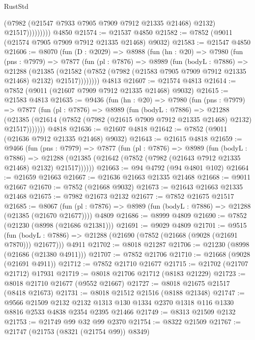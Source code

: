 \begin{lexlean}{RustStd}
\begin{coremodule}
                      (@7982 (@21547 @7933 @7905 @7909 @7912 @21335 @21468) @2132)
                      @21517)))))))))
    @4850
@21574 := @21537 @4850
@21582 := @7852 (@9011 (@21574 @7905 @7909 @7912 @21335 @21468) @9032)
@21583 := @21547 @4850
@21606 := @8070
    (fun (D : @2029) =>
    @8988
      (fun (hn : @20) =>
      @7980
        (fun (pns : @7979) =>
        @7877
          (fun (pl : @7876) =>
          @8989
            (fun (bodyL : @7886) =>
            @21288
              (@21385
                (@21582 (@7852 (@7982 (@21583 @7905 @7909 @7912 @21335 @21468) @2132) @21517))))))))
    @4813
@21607 := @21574 @4813
@21614 := @7852 (@9011 (@21607 @7909 @7912 @21335 @21468) @9032)
@21615 := @21583 @4813
@21635 := @9436
    (fun (hn : @20) =>
    @7980
      (fun (pns : @7979) =>
      @7877
        (fun (pl : @7876) =>
        @8989
          (fun (bodyL : @7886) =>
          @21288
            (@21385 (@21614 (@7852 (@7982 (@21615 @7909 @7912 @21335 @21468) @2132) @21517)))))))
    @4818
@21636 := @21607 @4818
@21642 := @7852 (@9011 (@21636 @7912 @21335 @21468) @9032)
@21643 := @21615 @4818
@21659 := @9466
    (fun (pns : @7979) =>
    @7877
      (fun (pl : @7876) =>
      @8989
        (fun (bodyL : @7886) =>
        @21288 (@21385 (@21642 (@7852 (@7982 (@21643 @7912 @21335 @21468) @2132) @21517))))))
@21663 := @94 @4792 (@94 @4801 @102)
@21664 := @21659 @21663
@21667 := @21636 @21663 @21335 @21468
@21668 := @9011 @21667
@21670 := @7852 (@21668 @9032)
@21673 := @21643 @21663 @21335 @21468
@21675 := @7982 @21673 @2132
@21677 := @7852 @21675 @21517
@21685 := @8067
    (fun (pl : @7876) => @8989 (fun (bodyL : @7886) => @21288 (@21385 (@21670 @21677))))
    @4809
@21686 := @8999 @4809
@21690 := @7852 (@21230 (@8998 (@21686 @21381)))
@21691 := @9029 @4809
@21701 := @9515
    (fun (bodyL : @7886) => @21288 (@21690 (@7852 (@21668 (@9028 (@21691 @7870))) @21677)))
    @4911
@21702 := @8018 @21287
@21706 := @21230 (@8998 (@21686 (@21380 @4911)))
@21707 := @7852 @21706
@21710 := @21668 (@9028 (@21691 @4911))
@21712 := @7852 @21710 @21677
@21715 := @21702 (@21707 @21712) @17931
@21719 := @8018 @21706 @21712 (@8183 @21229)
@21723 := @8018 @21710 @21677 (@9552 @21667)
@21727 := @8018 @21675 @21517 (@8418 @21673)
@21731 := @8018 @21512 @21516 (@8188 @21348)
@21747 := @9566
    @21509
    @2132
    @2132
    @1313
    @130
    @1334
    @2370
    @1318
    @116
    @1330
    @8816
    @2533
    @4838
    @2354
    @2395
    @21466
@21749 := @8313 @21509 @2132
@21753 := @21749 @99 @32 @99 @2370
@21754 := @8322 @21509
@21767 := @21747
    (@21753 (@8321 (@21754 @99)) @8349)

\end{coremodule}
\end{lexlean}
